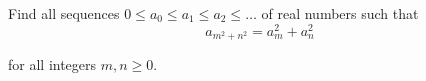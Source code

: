 Find all sequences $0\le a_0\le a_1\le a_2\le \ldots$ of real numbers such that\[a_{m^2+n^2}=a_m^2+a_n^2 \]

for all integers $m,n\ge 0$.